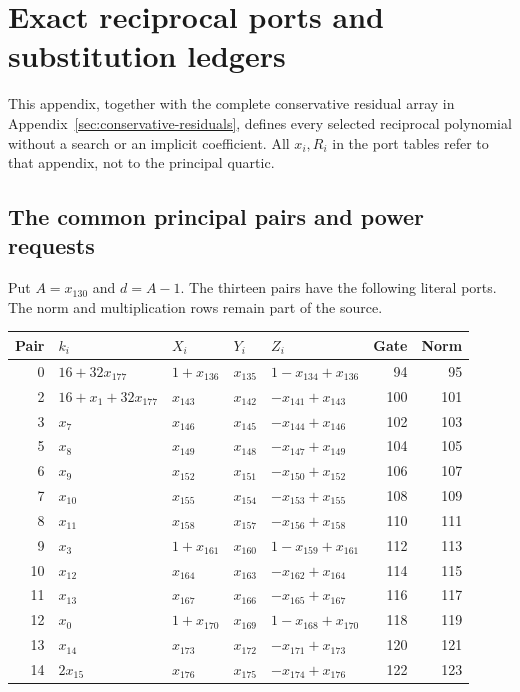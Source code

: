 \section{Exact reciprocal ports and substitution ledgers}
\label{sec:reciprocal-ledger}
This appendix, together with the complete conservative residual array in Appendix~\ref{sec:conservative-residuals}, defines every selected reciprocal polynomial without a search or an implicit coefficient. All $x_i,R_i$ in the port tables refer to that appendix, not to the principal quartic.
\subsection{The common principal pairs and power requests}
Put $A=x_{130}$ and $d=A-1$. The thirteen pairs have the following literal ports. The norm and multiplication rows remain part of the source.
\begin{center}\small\setlength{\tabcolsep}{5pt}
\begin{tabular}{@{}rllllrr@{}}\toprule
Pair & $k_i$ & $X_i$ & $Y_i$ & $Z_i$ & Gate & Norm\\\midrule
0 & $16+32x_{177}$ & $1+x_{136}$ & $x_{135}$ & $1-x_{134}+x_{136}$ & 94 & 95\\
2 & $16+x_{1}+32x_{177}$ & $x_{143}$ & $x_{142}$ & $-x_{141}+x_{143}$ & 100 & 101\\
3 & $x_{7}$ & $x_{146}$ & $x_{145}$ & $-x_{144}+x_{146}$ & 102 & 103\\
5 & $x_{8}$ & $x_{149}$ & $x_{148}$ & $-x_{147}+x_{149}$ & 104 & 105\\
6 & $x_{9}$ & $x_{152}$ & $x_{151}$ & $-x_{150}+x_{152}$ & 106 & 107\\
7 & $x_{10}$ & $x_{155}$ & $x_{154}$ & $-x_{153}+x_{155}$ & 108 & 109\\
8 & $x_{11}$ & $x_{158}$ & $x_{157}$ & $-x_{156}+x_{158}$ & 110 & 111\\
9 & $x_{3}$ & $1+x_{161}$ & $x_{160}$ & $1-x_{159}+x_{161}$ & 112 & 113\\
10 & $x_{12}$ & $x_{164}$ & $x_{163}$ & $-x_{162}+x_{164}$ & 114 & 115\\
11 & $x_{13}$ & $x_{167}$ & $x_{166}$ & $-x_{165}+x_{167}$ & 116 & 117\\
12 & $x_{0}$ & $1+x_{170}$ & $x_{169}$ & $1-x_{168}+x_{170}$ & 118 & 119\\
13 & $x_{14}$ & $x_{173}$ & $x_{172}$ & $-x_{171}+x_{173}$ & 120 & 121\\
14 & $2x_{15}$ & $x_{176}$ & $x_{175}$ & $-x_{174}+x_{176}$ & 122 & 123\\
\bottomrule\end{tabular}\end{center}
